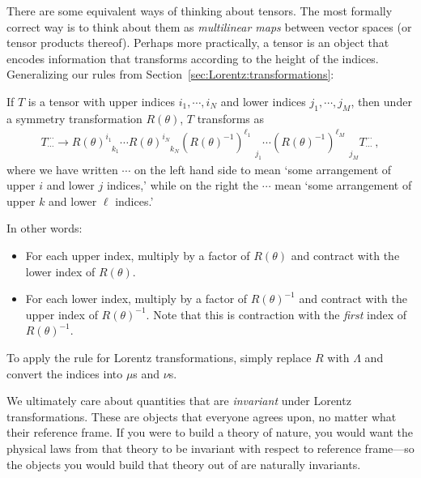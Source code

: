 \documentclass[12pt, oneside]{report}    %
\begin{document}
There are some equivalent ways of thinking about tensors. The most formally correct way is to think about them as \emph{multilinear maps} between vector spaces (or tensor products thereof). Perhaps more practically, a tensor is an object that encodes information that transforms according to the height of the indices. Generalizing our rules from Section~\ref{sec:Lorentz:transformations}:
% 
\begin{newrule}\label{rule:tensor:transform}
If $T$ is a tensor with upper indices $i_1, \cdots, i_N$ and lower indices $j_1, \cdots, j_M$, then under a symmetry transformation $R(\theta)$, $T$ transforms as
\begin{align}
    T^{\cdots}_{\cdots} \to 
    R(\theta)^{i_1}_{\phantom{i_1} k_1} 
    \cdots 
    R(\theta)^{i_N}_{\phantom{i_N} k_N}
    (R(\theta)^{-1})^{\ell_1}_{\phantom{\ell_1}j_1} 
    \cdots 
    (R(\theta)^{-1})^{\ell_M}_{\phantom{\ell_M}j_M} T^{\cdots}_{\cdots} \ ,
\end{align}
where we have written $\cdots$ on the left hand side to mean `some arrangement of upper $i$ and lower $j$ indices,' while on the right the $\cdots$ mean `some arrangement of upper $k$ and lower $\ell$ indices.'

In other words:
\begin{itemize}
    \item For each upper index, multiply by a factor of $R(\theta)$ and contract with the lower index of $R(\theta)$.
    \item For each lower index, multiply by a factor of $R(\theta)^{-1}$ and contract with the upper index of $R(\theta)^{-1}$. Note that this is contraction with the \emph{first} index of $R(\theta)^{-1}$. 
\end{itemize}
\end{newrule}
To apply the rule for Lorentz transformations, simply replace $R$ with $\Lambda$ and convert the indices into $\mu$s and $\nu$s. 

We ultimately care about quantities that are \emph{invariant} under Lorentz transformations. These are objects that everyone agrees upon, no matter what their reference frame. If you were to build a theory of nature, you would want the physical laws from that theory to be invariant with respect to reference frame---so the objects you would build that theory out of are naturally invariants. 
\end{document}
